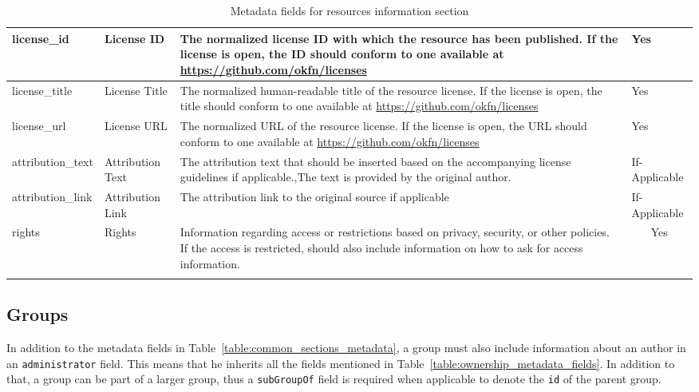 \begin{center}
{\begin{longtable}[h]{|l|p{2cm}|p{9cm}|c|}
license\_id                       & License ID                       & The normalized license ID with which the resource has been published. If the license is open, the ID should conform to one available at \url{https://github.com/okfn/licenses}         & \multicolumn{1}{l|}{Yes}            \\ \hline
license\_title                    & License Title                    & The normalized human-readable title of the resource license. If the license is open, the title should conform to one available at \url{https://github.com/okfn/licenses}                        & \multicolumn{1}{l|}{Yes}            \\ \hline
license\_url                      & License URL                      & The normalized URL of the resource license. If the license is open, the URL should conform to one available at \url{https://github.com/okfn/licenses}                                             & \multicolumn{1}{l|}{Yes}            \\ \hline
attribution\_text                 & Attribution Text                 & The attribution text that should be inserted based on the accompanying license guidelines if applicable.,The text is provided by the original author.                                          & \multicolumn{1}{l|}{If-Applicable}  \\ \hline
attribution\_link                 & Attribution Link                 & The attribution link to the original source if applicable                                                                                                                                      & \multicolumn{1}{l|}{If-Applicable}  \\ \hline
rights                            & Rights                           & Information regarding access or restrictions based on privacy, security, or other policies. If the access is restricted, should also include information on how to ask for access information. & Yes                                 \\ \hline

\caption[Metadata fields for resources information section]{Metadata fields for resources information section} \label{table:resources_metadata_fields} \\

\end{longtable}
}
\end{center}


\subsection{Groups}
In addition to the metadata fields in Table~\ref{table:common_sections_metadata}, a group must also include information about an author in an \texttt{administrator} field. This means that he inherits all the fields mentioned in Table~\ref{table:ownership_metadata_fields}. In addition to that, a group can be part of a larger group, thus a \texttt{subGroupOf} field is required when applicable to denote the \texttt{id} of the parent group.

